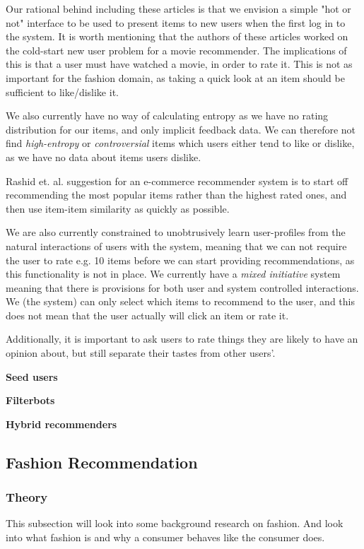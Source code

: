 Our rational behind including these articles is that we envision a simple "hot or not" interface to be used to present items to new users when the first log in to the system. It is worth mentioning that the authors of these articles worked on the cold-start new user
problem for a movie recommender. The implications of this is that a user must have watched a movie, in order to rate it. This is not as important for the fashion domain, as taking a quick look at an item should be sufficient to like/dislike it. 

We also currently have no way of calculating entropy as we have no rating distribution for our items, and only implicit feedback data. We can therefore not find \emph{high-entropy} or \emph{controversial} items which users either tend to like or dislike, as we have no data about items users dislike. 

Rashid et. al. \cite{Rashid2002} suggestion for an e-commerce recommender system is to start off recommending the most popular
items rather than the highest rated ones, and then use item-item similarity as quickly as possible.


We are also currently constrained to unobtrusively learn user-profiles from the natural interactions of users with the system, meaning that we can not require the user to rate e.g. 10 items before we can start providing recommendations, as this functionality is not in place. We
currently have a \emph{mixed initiative} system meaning that there is
provisions for both user and system controlled interactions. We (the system)
can only select which items to recommend to the user, and this does not mean
that the user actually will click an item or rate it.

Additionally, it is important to ask users to rate things they
are likely to have an opinion about, but still separate their tastes from other users’.

\textbf{Seed users}


\textbf{Filterbots}

\textbf{Hybrid recommenders}


\subsection{Fashion Recommendation}

\subsubsection{Theory}
This subsection will look into some background research on fashion.
And look into what fashion is and why a consumer behaves like the consumer does.

